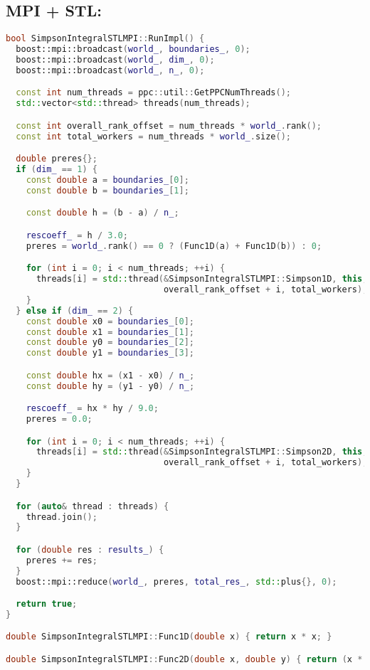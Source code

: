 \documentclass[12pt]{article}
\begin{document}
\subsection*{MPI + STL:}
\begin{lstlisting}[language=C++]
bool SimpsonIntegralSTLMPI::RunImpl() {
  boost::mpi::broadcast(world_, boundaries_, 0);
  boost::mpi::broadcast(world_, dim_, 0);
  boost::mpi::broadcast(world_, n_, 0);

  const int num_threads = ppc::util::GetPPCNumThreads();
  std::vector<std::thread> threads(num_threads);

  const int overall_rank_offset = num_threads * world_.rank();
  const int total_workers = num_threads * world_.size();

  double preres{};
  if (dim_ == 1) {
    const double a = boundaries_[0];
    const double b = boundaries_[1];

    const double h = (b - a) / n_;

    rescoeff_ = h / 3.0;
    preres = world_.rank() == 0 ? (Func1D(a) + Func1D(b)) : 0;

    for (int i = 0; i < num_threads; ++i) {
      threads[i] = std::thread(&SimpsonIntegralSTLMPI::Simpson1D, this, h, a, b, std::ref(results_[i]),
                               overall_rank_offset + i, total_workers);
    }
  } else if (dim_ == 2) {
    const double x0 = boundaries_[0];
    const double x1 = boundaries_[1];
    const double y0 = boundaries_[2];
    const double y1 = boundaries_[3];

    const double hx = (x1 - x0) / n_;
    const double hy = (y1 - y0) / n_;

    rescoeff_ = hx * hy / 9.0;
    preres = 0.0;

    for (int i = 0; i < num_threads; ++i) {
      threads[i] = std::thread(&SimpsonIntegralSTLMPI::Simpson2D, this, hx, hy, x0, x1, y0, y1, std::ref(results_[i]),
                               overall_rank_offset + i, total_workers);
    }
  }

  for (auto& thread : threads) {
    thread.join();
  }

  for (double res : results_) {
    preres += res;
  }
  boost::mpi::reduce(world_, preres, total_res_, std::plus{}, 0);

  return true;
}

double SimpsonIntegralSTLMPI::Func1D(double x) { return x * x; }

double SimpsonIntegralSTLMPI::Func2D(double x, double y) { return (x * x) + (y * y); }


\end{lstlisting}
\end{document}
